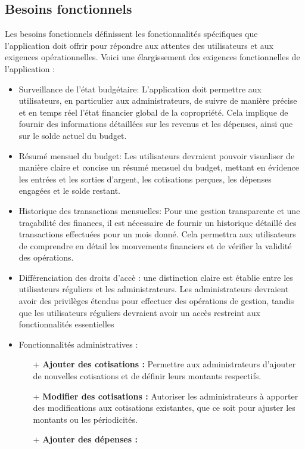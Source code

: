 \subsection{Besoins fonctionnels}
Les besoins fonctionnels définissent les fonctionnalités spécifiques que l'application doit offrir pour répondre aux attentes des utilisateurs et aux exigences opérationnelles. 
Voici une élargissement des exigences fonctionnelles de l'application :
\begin{itemize}
    \item Surveillance de l'état budgétaire: L'application doit permettre aux utilisateurs, en particulier aux administrateurs, de suivre de manière précise et en temps réel l'état financier global de la copropriété. Cela implique de fournir des informations détaillées sur les revenus et les dépenses, ainsi que sur le solde actuel du budget.
    \item Résumé mensuel du budget: Les utilisateurs devraient pouvoir visualiser de manière claire et concise un résumé mensuel du budget, mettant en évidence les entrées et les sorties d'argent, les cotisations perçues, les dépenses engagées et le solde restant.
    \item Historique des transactions mensuelles: Pour une gestion transparente et une traçabilité des finances, il est nécessaire de fournir un historique détaillé des transactions effectuées pour un mois donné. Cela permettra aux utilisateurs de comprendre en détail les mouvements financiers et de vérifier la validité des opérations.
    \item Différenciation des droits d'accè : une distinction claire est établie  entre les utilisateurs réguliers et les administrateurs. Les administrateurs devraient avoir des privilèges étendus pour effectuer des opérations de gestion, tandis que les utilisateurs réguliers devraient avoir un accès restreint aux fonctionnalités essentielles
    \item Fonctionnalités administratives : 
    \begin{itemize}
        \item[+] \textbf{Ajouter des cotisations : }
        Permettre aux administrateurs d'ajouter de nouvelles cotisations et de définir leurs montants respectifs.
        \item[+] \textbf{Modifier des cotisations :}
        Autoriser les administrateurs à apporter des modifications aux cotisations existantes, que ce soit pour ajuster les montants ou les périodicités.
        \item[+] \textbf{Ajouter des dépenses :}

\end{itemize}
\end{itemize}
